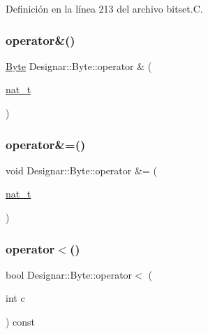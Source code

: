 Definición en la línea 213 del archivo bitset.\+C.

\mbox{\label{class_designar_1_1_byte_a7b0c40979b481f74b5e35d0679a71a9b}} 
\subsubsection{\texorpdfstring{operator\&()}{operator\&()}}
{\footnotesize\ttfamily \hyperlink{class_designar_1_1_byte}{Byte} Designar\+::\+Byte\+::operator \& (\begin{DoxyParamCaption}\item[{\hyperlink{namespace_designar_aa72662848b9f4815e7bf31a7cf3e33d1}{nat\+\_\+t}}]{ }\end{DoxyParamCaption})}

\mbox{\label{class_designar_1_1_byte_a3242f8e4098b308f9960a2a172105967}} 
\subsubsection{\texorpdfstring{operator\&=()}{operator\&=()}}
{\footnotesize\ttfamily void Designar\+::\+Byte\+::operator \&= (\begin{DoxyParamCaption}\item[{\hyperlink{namespace_designar_aa72662848b9f4815e7bf31a7cf3e33d1}{nat\+\_\+t}}]{ }\end{DoxyParamCaption})}

\mbox{\label{class_designar_1_1_byte_a94fc22c57bdeed7f674f7db0499becd3}} 
\subsubsection{\texorpdfstring{operator$<$()}{operator<()}}
{\footnotesize\ttfamily bool Designar\+::\+Byte\+::operator$<$ (\begin{DoxyParamCaption}\item[{int}]{c }\end{DoxyParamCaption}) const}




